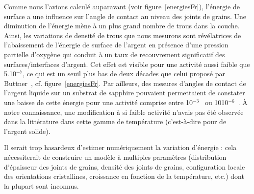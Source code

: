 {{Comme nous l’avions calculé auparavant (voir figure~\ref{energiesFr}), l’énergie de surface a une influence sur l’angle de contact au niveau des joints de grains. Une diminution de l’énergie mène à un plus grand nombre de trous dans la couche. Ainsi, les variations de densité de trous que nous mesurons sont révélatrices de l’abaissement de l’énergie de surface de l’argent en présence d'une pression partielle d'oxygène qui conduit à un taux de recouvrement significatif des surfaces/interfaces d'argent. Cet effet est visible pour une activité aussi faible que 5.10$^{-7}$, ce qui est un seuil plus bas de deux décades que celui proposé par Buttner~\cite{buttner1952adsorption}, cf. figure~\ref{energiesFr}. Par ailleurs, des mesures d'angles de contact de l'argent liquide sur un substrat de sapphire pouvaient permettaient de constater une baisse de cette énergie pour une activité comprise entre 10$^{-3}$~\cite{chatain94} ou 1010$^{-6}$~\cite{muolo08}.  À notre connaissance, une modification à si faible activité n’avais pas été observée dans la littérature dans cette gamme de température (c'est-à-dire pour de l'argent solide).\par 
Il serait trop hasardeux d’estimer numériquement la variation d’énergie : cela nécessiterait de construire un modèle à multiples paramètres (distribution d’épaisseur des joints de grains, densité des joints de grains, configuration locale des orientations cristallines, croissance en fonction de la température, etc.) dont la plupart sont inconnus.\par 
{}
}}
